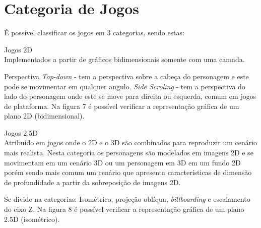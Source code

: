 \section{Categoria de Jogos}
\label{sec:categoria-de-jogos}

É possível classificar os jogos em 3 categorias, sendo estas:
\begin{alineascomponto}

\item Jogos 2D\\
Implementados a partir de gráficos bidimensionais somente com uma camada.

 Perspectiva \textit{ Top-down} - tem a perspectiva sobre a cabeça do personagem e este pode se movimentar em qualquer angulo.
 \textit{Side Scroling} - tem a perspectiva do lado do personagem onde este se move para direita ou esquerda, comum em jogos de plataforma. Na figura 7 é possível verificar a representação gráfica de um plano 2D (bidimensional). \cite{graf}

\end{alineascomponto}


\begin{figure}[h!]
		\centering
	\end{figure}

\begin{alineascomponto}
\pagebreak

\item Jogos 2.5D\\
Atribuído em jogos onde o 2D e o 3D são combinados para reproduzir um cenário mais realista. Nesta categoria os personagens são modelados em imagens 2D e se movimentam em um cenário 3D ou um personagem em 3D em um fundo 2D porém sendo mais comum um cenário que apresenta características de dimensão de profundidade a partir da sobreposição de imagens 2D.

Se divide na categorias: Isométrico, projeção oblíqua, \textit{billboarding} e escalamento do eixo Z. Na figura 8 é possível verificar a representação gráfica de um plano 2.5D (isométrico). \cite{graf}

\end{alineascomponto}

